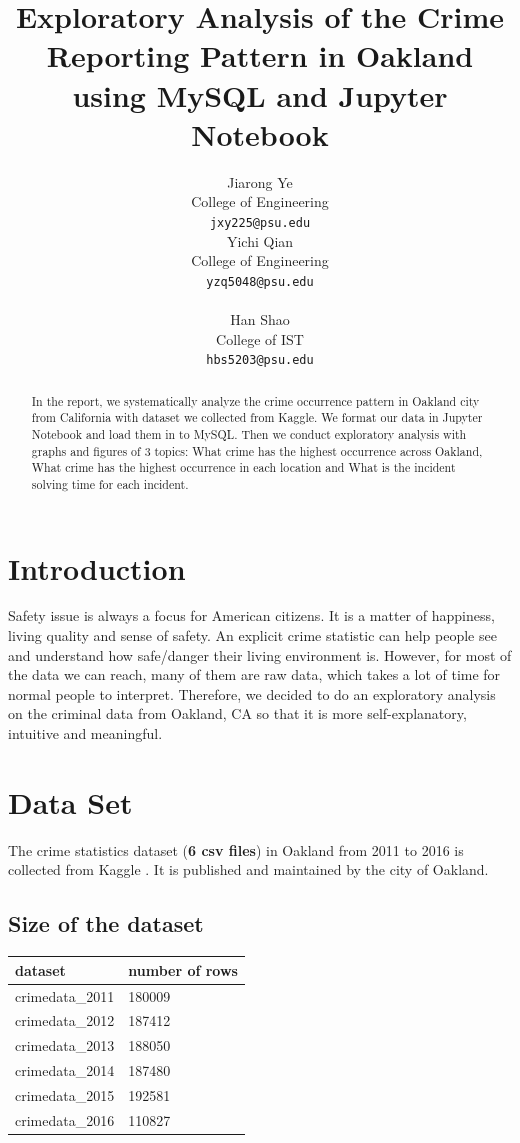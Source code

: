 \documentclass{article} %
\title{Exploratory Analysis of the Crime Reporting Pattern in Oakland using MySQL and Jupyter Notebook}
\author{
	Jiarong Ye\\
	College of Engineering\\
	\texttt{jxy225@psu.edu} \\
	\And
	Yichi Qian\\
	College of Engineering\\
	\texttt{yzq5048@psu.edu} \\
	\\
	\And
	Han Shao\\
	College of IST \\
	\texttt{hbs5203@psu.edu} \\	
}
\begin{document}
\maketitle

\begin{abstract}

In the report, we systematically analyze the crime occurrence pattern in Oakland city from California with dataset we collected from Kaggle. We format our data in Jupyter Notebook and load them in to MySQL. Then we conduct exploratory analysis with graphs and figures of 3 topics: What crime has the highest occurrence across Oakland, What crime has the highest occurrence in each location and What is the incident solving time for each incident. 

\end{abstract}

\section{Introduction}


Safety issue is always a focus for American citizens. It is a matter of happiness, living quality and sense of safety. An explicit crime statistic can help people see and understand how safe/danger their living environment is. However, for most of the data we can reach, many of them are raw data, which takes a lot of time for normal people to interpret. Therefore, we decided to do an exploratory analysis on the criminal data from Oakland, CA so that it is more self-explanatory, intuitive and meaningful. 

\section{Data Set}

The crime statistics dataset (\textbf{6 csv files}) in Oakland from 2011 to 2016 is collected from Kaggle \cite{kaggle}. It is published and maintained by the city of Oakland. 


\subsection{Size of the dataset}
\begin{table}[H]
	\centering
\begin{tabular}{|l|l|}
	\toprule
	dataset &  number of rows \\
	\midrule
	crimedata\_2011 &    180009\\
	crimedata\_2012 &   187412 \\
	crimedata\_2013 &   188050 \\
	crimedata\_2014 &  187480 \\
	crimedata\_2015 &   192581 \\
	crimedata\_2016 & 110827 \\
	\bottomrule
\end{tabular}
\end{table}
\end{document}
